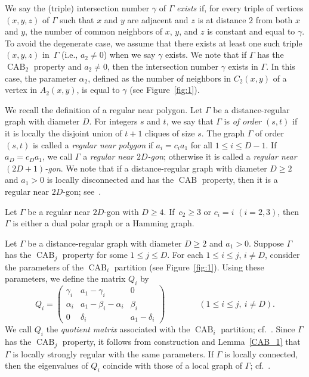We say the (triple) intersection number $\gamma$ of $\Gamma$ \emph{exists} if, for every triple of vertices $(x,y,z)$ of $\Gamma$ such that $x$ and $y$ are adjacent and $z$ is at distance $2$ from both $x$ and $y$, the number of common neighbors of $x$, $y$, and $z$ is constant and equal to $\gamma$.
To avoid the degenerate case, we assume that there exists at least one such triple $(x,y,z)$ in~$\Gamma$ (i.e., $a_2\neq0$) when we say $\gamma$ exists.
We note that if $\Gamma$ has the $\operatorname{CAB}_2$ property and $a_2\neq 0$, then the intersection number $\gamma$ exists in $\Gamma$. 
In this case, the parameter $\alpha_2$, defined as the number of neighbors in $C_2(x,y)$ of a vertex in $A_2(x,y)$, is equal to $\gamma$ (see Figure~\ref{fig:1}).

We recall the definition of a regular near polygon.
Let $\Gamma$ be a distance-regular graph with diameter $D$.
For integers $s$ and $t$, we say that $\Gamma$ is \emph{of order $(s,t)$} if it is locally the disjoint union of $t+1$ cliques of size $s$.
The graph $\Gamma$ of order $(s,t)$ is called a \emph{regular near polygon} if $a_i=c_ia_1$ for all $1\leq i \leq D-1$.
If $a_D=c_Da_1$, we call $\Gamma$ a \emph{regular near $2D$-gon}; otherwise it is called a \emph{regular near $(2D+1)$-gon}.
We note that if a distance-regular graph with diameter $D \geqslant 2$ and $a_1 > 0$ is locally disconnected and has the $\operatorname{CAB}$ property, then it is a regular near $2D$-gon; see~\cite[Theorem 2.3]{JK2000-1}.

\begin{lemm}\label{dual polar}
Let $\Gamma$ be a regular near $2D$-gon with $D \geqslant 4$. 
If~$c_2 \geqslant 3$ or $c_i = i$ $(i=2,3)$, then $\Gamma$ is either a dual polar graph or a Hamming graph.
\end{lemm}

Let $\Gamma$ be a distance-regular graph with diameter $D\geqslant 2$ and $a_1>0$.
Suppose $\Gamma$ has the $\operatorname{CAB}_j$ property for some $1\leq j \leq D$.
For each $1\leqslant i \leqslant j$, $i\neq D$, consider the parameters of the $\operatorname{CAB}_i$ partition (see Figure~\ref{fig:1}).
Using these parameters, we define the matrix $Q_i$ by
\begin{equation}\label{Qi}
	Q_i =
	\begin{pmatrix}
	\gamma_i & a_1-\gamma_i & 0 \\
	\alpha_i & a_1 -\beta_i -\alpha_i & \beta_i \\ 
	0 & \delta_i & a_1 -\delta_i
	\end{pmatrix}
	\qquad \qquad 
	(1 \leqslant i \leqslant j, \ i \neq D).
\end{equation}
We call $Q_i$ the \emph{quotient matrix} associated with the $\operatorname{CAB}_i$ partition; cf.~{\cite[Theorem~2.4]{JK2000-1}}.
Since $\Gamma$ has the $\operatorname{CAB}_j$ property, it follows from construction and Lemma~\ref{CAB_1} that $\Gamma$ is locally strongly regular with the same parameters.
If $\Gamma$ is locally connected, then the eigenvalues of $Q_i$ coincide with those of a local graph of $\Gamma$; cf.~\cite[Lemma~2.6]{JK2000-1}.


